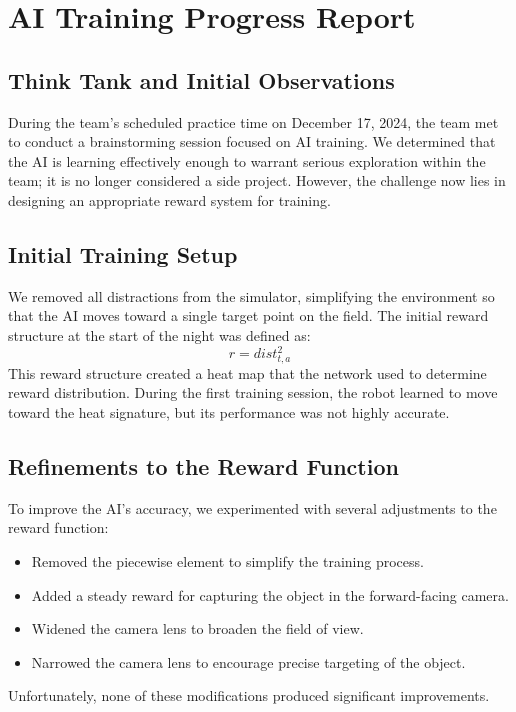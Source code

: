 \label{AI-Improvments (December 18, 2024)}
\section*{AI Training Progress Report }

\subsection*{Think Tank and Initial Observations}
During the team's scheduled practice time on December 17, 2024, the team met to conduct a brainstorming session focused on AI training. We determined that the AI is learning effectively enough to warrant serious exploration within the team; it is no longer considered a side project. However, the challenge now lies in designing an appropriate reward system for training.

\subsection*{Initial Training Setup}
We removed all distractions from the simulator, simplifying the environment so that the AI moves toward a single target point on the field. The initial reward structure at the start of the night was defined as:
\[
    r = dist_{t, a}^2
\]
This reward structure created a heat map that the network used to determine reward distribution. During the first training session, the robot learned to move toward the heat signature, but its performance was not highly accurate.

\subsection*{Refinements to the Reward Function}
To improve the AI's accuracy, we experimented with several adjustments to the reward function:
\begin{itemize}
    \item Removed the piecewise element to simplify the training process.
    \item Added a steady reward for capturing the object in the forward-facing camera.
    \item Widened the camera lens to broaden the field of view.
    \item Narrowed the camera lens to encourage precise targeting of the object.
\end{itemize}
Unfortunately, none of these modifications produced significant improvements.

